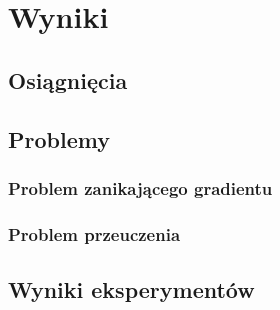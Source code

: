 \newpage
\section{Wyniki}
\subsection{Osiągnięcia}
\subsection{Problemy}
\subsubsection{Problem zanikającego gradientu}
\subsubsection{Problem przeuczenia}
\subsection{Wyniki eksperymentów}
